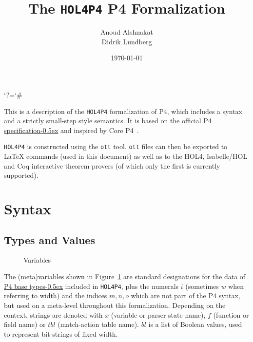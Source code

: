 \documentclass[UTF8]{article}
\title{%
The \texttt{HOL4P4} P4 Formalization}
\author{Anoud Alshnakat\\
Didrik Lundberg
}
\date{\today}
\begin{document}
\maketitle

\newcommand{\pfott}{\texttt{HOL4P4}}

\begingroup\lccode`?=`# \lowercase{\endgroup
\newcommand{\specsec}[1]{%
    ?#1%
}
}
\newcommand{\pfourspec}[2]{%
\href{https://p4.org/p4-spec/docs/P4-16-v-1.2.3.html\specsec{#1}}{#2\kern-0.5ex} %
}

\noindent
This is a description of the \pfott{} formalization of P4, which includes a syntax and a strictly small-step style semantics. It is based on \pfourspec{}{the official P4 specification} and inspired by Core P4~\cite{doenges2021petr4}.

\pfott{} is constructed using the \texttt{ott} tool. \texttt{ott} files can then be exported to \LaTeX{} commands (used in this document) as well as to the HOL4, Isabelle/HOL and Coq interactive theorem provers (of which only the first is currently supported).


\newcommand{\vn}{\ensuremath{x}}
\newcommand{\fn}{\ensuremath{f}}
\newcommand{\tn}{\ensuremath{\mathit{tbl}}}
\newcommand{\inte}{\ensuremath{bl}}
\newcommand{\num}{\ensuremath{i}}
\newcommand{\wid}{\ensuremath{w}}
\section{Syntax}
\subsection{Types and Values}

\begin{figure}[h!]
\centering
\ottmetavars
\caption{Variables}
\label{fig:vars}
\end{figure}

The (meta)variables shown in Figure~\ref{fig:vars} are standard designations for the data of \pfourspec{sec-base-types}{P4 base types} included in \pfott{}, plus the numerals \num{} (sometimes \wid{} when referring to width) and the indices $m, n, o$ which are not part of the P4 syntax, but used on a meta-level throughout this formalization. Depending on the context, strings are denoted with \vn{} (variable or parser state name), \fn{} (function or field name) or \tn{} (match-action table name). \inte{} is a list of Boolean values, used to represent bit-strings of fixed width.
\end{document}
